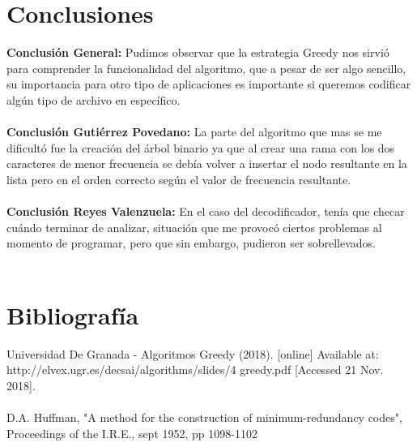 \documentclass[12pt,twoside]{article}
\begin{document}
\section{Conclusiones}
\textbf{Conclusi\'on General: }Pudimos observar que la estrategia Greedy nos sirvi\'o para comprender la funcionalidad del algoritmo, que a pesar de ser algo sencillo, su importancia para otro tipo de aplicaciones es importante si queremos codificar alg\'un tipo de archivo en espec\'ifico.\\\\
\textbf{Conclusi\'on Guti\'errez Povedano: }La parte del algoritmo que mas se me dificult\'o fue la creación del \'arbol binario ya que al crear una rama con los dos caracteres de menor frecuencia se deb\'ia volver a insertar el nodo resultante en la lista pero en el orden correcto seg\'un el valor de frecuencia resultante.
\\\\
\textbf{Conclusi\'on Reyes Valenzuela:} En el caso del decodificador, ten\'ia que checar cu\'ando terminar de analizar, situaci\'on que me provoc\'o ciertos problemas al momento de programar, pero que sin embargo, pudieron ser sobrellevados.\\\\
\section{Bibliograf\'ia}
Universidad De Granada - Algoritmos Greedy (2018). [online] Available at: http://elvex.ugr.es/decsai/algorithms/slides/4 greedy.pdf [Accessed 21 Nov. 2018].\\\\
D.A. Huffman, "A method for the construction of minimum-redundancy codes", Proceedings of the I.R.E., sept 1952, pp 1098-1102\\\\
\end{document}
